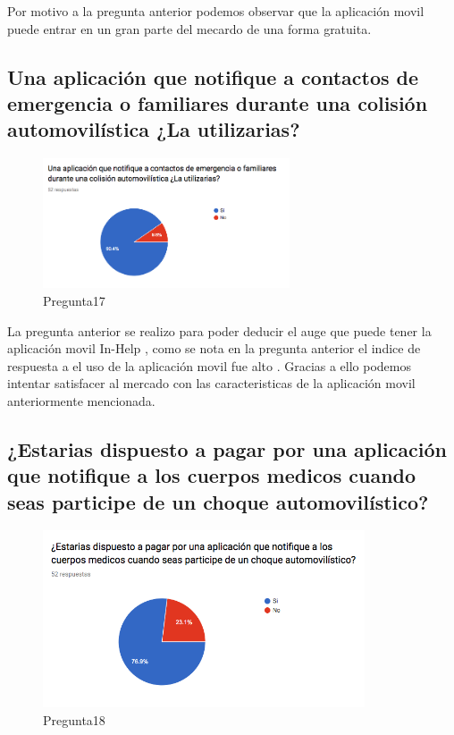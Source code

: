 Por motivo a la pregunta anterior podemos observar que la aplicación movil puede entrar en un gran parte del mecardo de una forma gratuita.

\subsection{Una aplicación que notifique a contactos de emergencia o familiares durante una colisión automovilística ¿La utilizarias?}

\begin{figure}[htbp!]
	\begin{center}
		\includegraphics[width=0.65\textwidth]{DisenoEstructura/imagenes/Pregunta17}
		\caption{Pregunta17}
		\label{DE/FO/Pregunta17}
	\end{center}
\end{figure}

La pregunta anterior se realizo para poder deducir el auge que puede tener la aplicación movil In-Help , como se nota en la pregunta anterior el indice de respuesta a el uso de la aplicación movil fue alto . Gracias a ello podemos intentar satisfacer al mercado con las caracteristicas de la aplicación movil anteriormente mencionada.

\subsection{¿Estarias dispuesto a pagar por una aplicación que notifique a los cuerpos medicos cuando seas participe de un choque automovilístico?}

\begin{figure}[htbp!]
	\begin{center}
		\includegraphics[width=0.85\textwidth]{DisenoEstructura/imagenes/Pregunta18}
		\caption{Pregunta18}
		\label{DE/FO/Pregunta18}
	\end{center}
\end{figure}

